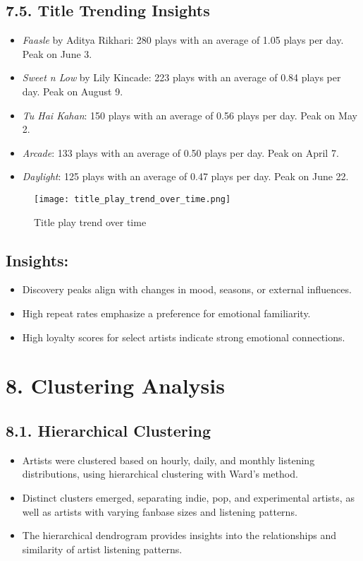 \documentclass[12pt]{article}
\begin{document}
\begin{itemize}
\subsection*{7.5. Title Trending Insights}
\begin{itemize}
    \item \textit{Faasle} by Aditya Rikhari: 280 plays with an average of 1.05 plays per day. Peak on June 3.
    \item \textit{Sweet n Low} by Lily Kincade: 223 plays with an average of 0.84 plays per day. Peak on August 9.
    \item \textit{Tu Hai Kahan}: 150 plays with an average of 0.56 plays per day. Peak on May 2.
    \item \textit{Arcade}: 133 plays with an average of 0.50 plays per day. Peak on April 7.
    \item \textit{Daylight}: 125 plays with an average of 0.47 plays per day. Peak on June 22.
\end{itemize}
\begin{figure}[H]
    \centering
    \texttt{[image: title\_play\_trend\_over\_time.png]}
    \caption{Title play trend over time}
    \label{fig:enter-label}
\end{figure}
\subsection*{Insights:}
\begin{itemize}
    \item Discovery peaks align with changes in mood, seasons, or external influences.
    \item High repeat rates emphasize a preference for emotional familiarity.
    \item High loyalty scores for select artists indicate strong emotional connections.
\end{itemize}


\section*{8. Clustering Analysis}
\subsection*{8.1. Hierarchical Clustering}
\begin{itemize}
    \item Artists were clustered based on hourly, daily, and monthly listening distributions, using hierarchical clustering with Ward's method.
    \item Distinct clusters emerged, separating indie, pop, and experimental artists, as well as artists with varying fanbase sizes and listening patterns.
    \item The hierarchical dendrogram provides insights into the relationships and similarity of artist listening patterns.
\end{itemize}


\end{itemize}
\end{document}
